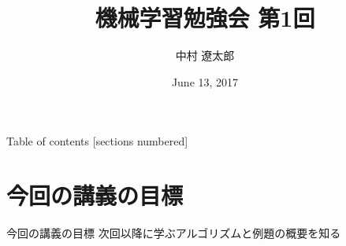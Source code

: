 \documentclass[dvipdfmx,platex]{beamer}
\title{{\mgfamily 機械学習勉強会 第1回}}
\date{June 13, 2017}
\author{{\mgfamily 中村 遼太郎}}
\institute{}
\begin{document}
\mgfamily
\maketitle
\begin{frame}{Table of contents}
  [sections numbered]
  \tableofcontents[hideallsubsections]
\end{frame}

\section{{\mgfamily 今回の講義の目標}}
\begin{frame}{{\mgfamily 今回の講義の目標}}
次回以降に学ぶアルゴリズムと例題の概要を知る
\end{frame}
\end{document}
